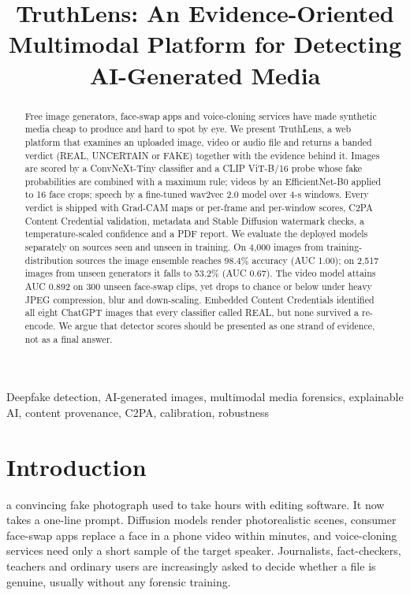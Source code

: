\documentclass[conference]{IEEEtran}
\begin{document}
\title{TruthLens: An Evidence-Oriented Multimodal Platform for Detecting AI-Generated Media}

\author{
}

\maketitle

\begin{abstract}
Free image generators, face-swap apps and voice-cloning services have made synthetic media cheap to produce and hard to spot by eye. We present TruthLens, a web platform that examines an uploaded image, video or audio file and returns a banded verdict (REAL, UNCERTAIN or FAKE) together with the evidence behind it. Images are scored by a ConvNeXt-Tiny classifier and a CLIP ViT-B/16 probe whose fake probabilities are combined with a maximum rule; videos by an EfficientNet-B0 applied to 16 face crops; speech by a fine-tuned wav2vec 2.0 model over 4-s windows. Every verdict is shipped with Grad-CAM maps or per-frame and per-window scores, C2PA Content Credential validation, metadata and Stable Diffusion watermark checks, a temperature-scaled confidence and a PDF report. We evaluate the deployed models separately on sources seen and unseen in training. On 4,000 images from training-distribution sources the image ensemble reaches 98.4\% accuracy (AUC 1.00); on 2,517 images from unseen generators it falls to 53.2\% (AUC 0.67). The video model attains AUC 0.892 on 300 unseen face-swap clips, yet drops to chance or below under heavy JPEG compression, blur and down-scaling. Embedded Content Credentials identified all eight ChatGPT images that every classifier called REAL, but none survived a re-encode. We argue that detector scores should be presented as one strand of evidence, not as a final answer.
\end{abstract}

\begin{IEEEkeywords}
Deepfake detection, AI-generated images, multimodal media forensics, explainable AI, content provenance, C2PA, calibration, robustness
\end{IEEEkeywords}


\section{Introduction}
 a convincing fake photograph used to take hours with editing software. It now takes a one-line prompt. Diffusion models render photorealistic scenes, consumer face-swap apps replace a face in a phone video within minutes, and voice-cloning services need only a short sample of the target speaker. Journalists, fact-checkers, teachers and ordinary users are increasingly asked to decide whether a file is genuine, usually without any forensic training.
\end{document}
